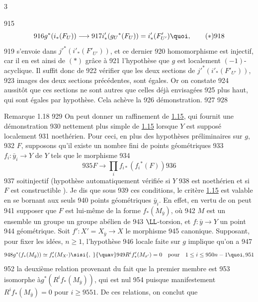 3	\documentclass[10pt]{../fichiers-configuration-latex/smfart}
\begin{document}
   915	\begin{equation*}
   916	g^{\ast}(i_{\ast}(F_U))\longrightarrow
   917	i'_{\ast}(g_U{}^{\ast}(F_U))=i'_{\ast}(F'_{U'}){\quoi},\tag{$\ast$}
   918	\end{equation*}
   919	s'envoie dans ${j'}^{\ast}(i'_{\ast}(F'_{U'}))$, et ce dernier
   920	homomorphisme est injectif, car il en est ainsi de $(\ast)$ grâce à
   921	l'hypothèse que $g$ est localement $(-1)$-acyclique. Il suffit donc de
   922	vérifier que les deux sections de ${j'}^{\ast}(i'_{\ast}(F'_{U'}))$,
   923	images des deux sections précédentes, sont égales. Or on constate
   924	aussitôt que ces sections ne sont autres que celles déjà envisagées
   925	plus haut, qui sont égales par hypothèse. Cela achève la
   926	démonstration.
   927	
   928	\begin{enonce*}{Remarque 1.18}
   929	On peut donner un raffinement de \hyperref[XV.thm1.15]{1.15}, qui fournit une démonstration
   930	nettement plus simple de \hyperref[XV.thm1.15]{1.15} lorsque $Y$ est supposé localement
   931	noethérien. Pour ceci, en plus des hypothèses préliminaires sur $g$,
   932	$F$, supposons qu'il existe un nombre fini de points géométriques
   933	$f_i:\bar{y}_i\rightarrow Y$ de $Y$ tels que le morphisme 
   934	$$
   935	F\longrightarrow \prod_if_{i\ast}(f_i{}^{\ast}(F))
   936	$$
   937	soit\pageoriginale injectif (hypothèse automatiquement vérifiée si $Y$
   938	est noethérien et si $F$ est constructible ). Je dis que sous
   939	ces conditions, le critère \hyperref[XV.thm1.15]{1.15} est valable en se bornant aux seuls
   940	points géométriques $\bar{y}_i$. En effet, en vertu de  on peut
   941	supposer que $F$ est lui-même de la forme $f_{\ast}(M_{\bar{y}})$, où
   942	$M$ est un ensemble \resp un groupe \resp un groupe abélien de
   943	$\LL$-torsion, et $f:\bar{y}\rightarrow Y$ un point
   944	géométrique. Soit $f':X'=X_{\bar{y}}\rightarrow X$ le morphisme
   945	canonique. Supposant, pour fixer les idées, $n\geq 1$, l'hypothèse
   946	locale faite sur $g$ implique qu'on a
   947	$$
   948	g^{\ast}(f_{\ast}(M_{\bar{y}}))\simeq f'_{\ast}(M_{X'})\sisi{,\;}{\quav}
   949	R^{i}f'_{\ast}(M_{x'})=0\quad\mbox{\rm pour}\quad 1\leq i\leq
   950	n-1{\quoi},
   951	$$
   952	la deuxième relation provenant du fait que la premier membre est
   953	isomorphe à\break $g^{\ast}(R^{i}f_{\ast}(M_{\bar{y}}))$, qui est nul
   954	puisque manifestement $R^{i}f_{\ast}(M_{\bar{y}})=0$ pour $i\geq
   955	1$. De ces relations, on conclut que

\end{enonce*}
\end{document}
